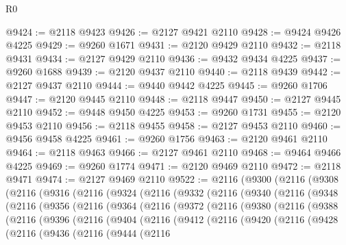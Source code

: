 \begin{lexlean}{R0}
\begin{coremodule}
@9424 := @2118 @9423
@9426 := @2127 @9421 @2110
@9428 := @9424 @9426 @4225
@9429 := @9260 @1671
@9431 := @2120 @9429 @2110
@9432 := @2118 @9431
@9434 := @2127 @9429 @2110
@9436 := @9432 @9434 @4225
@9437 := @9260 @1688
@9439 := @2120 @9437 @2110
@9440 := @2118 @9439
@9442 := @2127 @9437 @2110
@9444 := @9440 @9442 @4225
@9445 := @9260 @1706
@9447 := @2120 @9445 @2110
@9448 := @2118 @9447
@9450 := @2127 @9445 @2110
@9452 := @9448 @9450 @4225
@9453 := @9260 @1731
@9455 := @2120 @9453 @2110
@9456 := @2118 @9455
@9458 := @2127 @9453 @2110
@9460 := @9456 @9458 @4225
@9461 := @9260 @1756
@9463 := @2120 @9461 @2110
@9464 := @2118 @9463
@9466 := @2127 @9461 @2110
@9468 := @9464 @9466 @4225
@9469 := @9260 @1774
@9471 := @2120 @9469 @2110
@9472 := @2118 @9471
@9474 := @2127 @9469 @2110
@9522 := @2116
    (@9300
      (@2116
        (@9308
          (@2116
            (@9316
              (@2116
                (@9324
                  (@2116
                    (@9332
                      (@2116
                        (@9340
                          (@2116
                            (@9348
                              (@2116
                                (@9356
                                  (@2116
                                    (@9364
                                      (@2116
                                        (@9372
                                          (@2116
                                            (@9380
                                              (@2116
                                                (@9388
                                                  (@2116
                                                    (@9396
                                                      (@2116
                                                        (@9404
                                                          (@2116
                                                            (@9412
                                                              (@2116
                                                                (@9420
                                                                  (@2116
                                                                    (@9428
                                                                      (@2116
                                                                        (@9436
                                                                          (@2116
                                                                            (@9444
                                                                              (@2116

\end{coremodule}
\end{lexlean}
